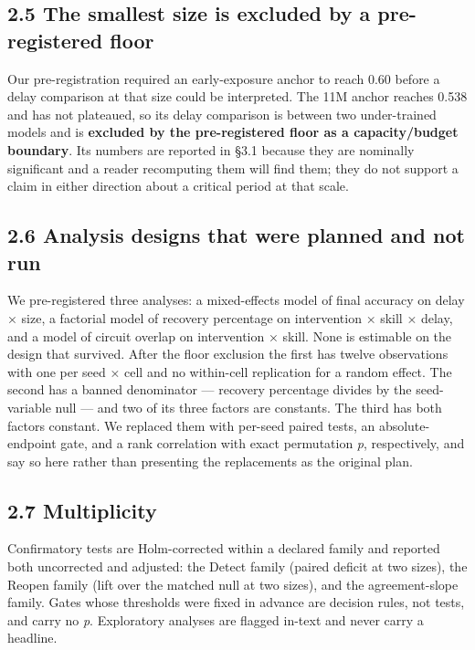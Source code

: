 \documentclass{article}
\begin{document}
\subsection{2.5 The smallest size is excluded by a pre-registered floor}\label{the-smallest-size-is-excluded-by-a-pre-registered-floor}

Our pre-registration required an early-exposure anchor to reach 0.60 before a delay
comparison at that size could be interpreted. The 11M anchor reaches 0.538 and has not
plateaued, so its delay comparison is between two under-trained models and is \textbf{excluded by
the pre-registered floor as a capacity/budget boundary}. Its numbers are reported in §3.1
because they are nominally significant and a reader recomputing them will find them; they do
not support a claim in either direction about a critical period at that scale.

\subsection{2.6 Analysis designs that were planned and not run}\label{analysis-designs-that-were-planned-and-not-run}

We pre-registered three analyses: a mixed-effects model of final accuracy on delay × size, a
factorial model of recovery percentage on intervention × skill × delay, and a model of
circuit overlap on intervention × skill. None is estimable on the design that survived. After
the floor exclusion the first has twelve observations with one per seed × cell and no
within-cell replication for a random effect. The second has a banned denominator --- recovery
percentage divides by the seed-variable null --- and two of its three factors are constants.
The third has both factors constant. We replaced them with per-seed paired tests, an
absolute-endpoint gate, and a rank correlation with exact permutation \emph{p}, respectively, and
say so here rather than presenting the replacements as the original plan.

\subsection{2.7 Multiplicity}\label{multiplicity}

Confirmatory tests are Holm-corrected within a declared family and reported both uncorrected
and adjusted: the Detect family (paired deficit at two sizes), the Reopen family (lift over
the matched null at two sizes), and the agreement-slope family. Gates whose thresholds were
fixed in advance are decision rules, not tests, and carry no \emph{p}. Exploratory analyses are
flagged in-text and never carry a headline.
\end{document}
